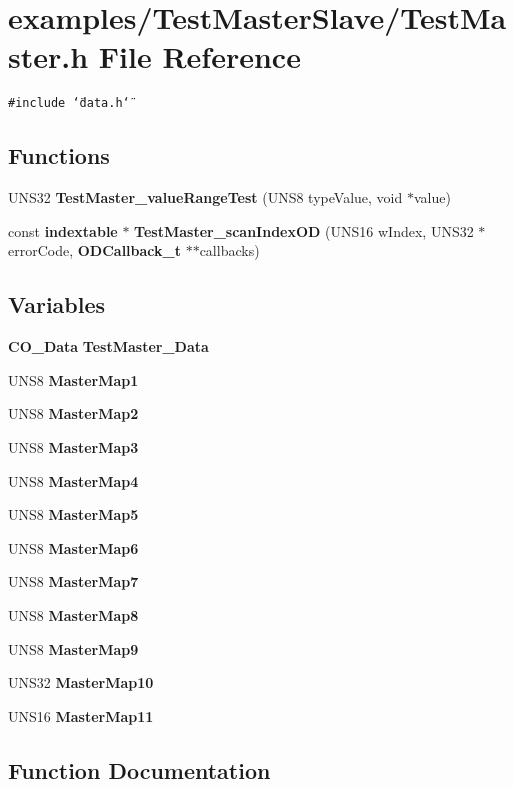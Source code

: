 \section{examples/Test\-Master\-Slave/Test\-Master.h File Reference}
\label{TestMasterSlave_2TestMaster_8h}
{\tt \#include \char`\"{}data.h\char`\"{}}\par
\subsection*{Functions}
\begin{CompactItemize}
\item 
UNS32 {\bf Test\-Master\_\-value\-Range\-Test} (UNS8 type\-Value, void $\ast$value)
\item 
const {\bf indextable} $\ast$ {\bf Test\-Master\_\-scan\-Index\-OD} (UNS16 w\-Index, UNS32 $\ast$error\-Code, {\bf ODCallback\_\-t} $\ast$$\ast$callbacks)
\end{CompactItemize}
\subsection*{Variables}
\begin{CompactItemize}
\item 
{\bf CO\_\-Data} {\bf Test\-Master\_\-Data}
\item 
UNS8 {\bf Master\-Map1}
\item 
UNS8 {\bf Master\-Map2}
\item 
UNS8 {\bf Master\-Map3}
\item 
UNS8 {\bf Master\-Map4}
\item 
UNS8 {\bf Master\-Map5}
\item 
UNS8 {\bf Master\-Map6}
\item 
UNS8 {\bf Master\-Map7}
\item 
UNS8 {\bf Master\-Map8}
\item 
UNS8 {\bf Master\-Map9}
\item 
UNS32 {\bf Master\-Map10}
\item 
UNS16 {\bf Master\-Map11}
\end{CompactItemize}


\subsection{Function Documentation}
